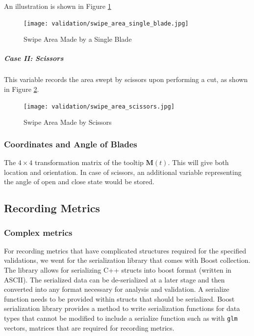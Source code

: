 An illustration is shown in Figure \ref{fig:single_blade_area}

\begin{figure}
  \centering%
  \texttt{[image: validation/swipe\_area\_single\_blade.jpg]}
  \caption{Swipe Area Made by a Single Blade}\label{fig:single_blade_area}
\end{figure}

\subparagraph{Case II: Scissors}

This variable records the area swept by scissors upon performing a cut, as shown in Figure \ref{fig:scissors_area}.

\begin{figure}
  \centering%
  \texttt{[image: validation/swipe\_area\_scissors.jpg]}
  \caption{Swipe Area Made by Scissors}\label{fig:scissors_area}
\end{figure}

\subsubsection{Coordinates and Angle of Blades}\label{para:data_coordinates_of_blades}

The $4\times 4$ transformation matrix of the tooltip $\mathbf{M}(t)$. This will give both location and orientation. In case of scissors, an additional variable representing the angle of open and close state would be stored.


\subsection{Recording Metrics}\label{chp:literature}

\subsubsection{Complex metrics}
For recording metrics that have complicated structures required for the specified validations, we went for the serialization library that comes with Boost collection. The library allows for serializing C++ structs into boost format (written in ASCII). The serialized data can be de-serialized at a later stage and then converted into any format necessary for analysis and validation. A serialize function needs to be provided within structs that should be serialized. Boost serialization library provides a method to write serialization functions for data types that cannot be modified to include a serialize function such as with \texttt{glm} vectors, matrices that are required for recording metrics.

